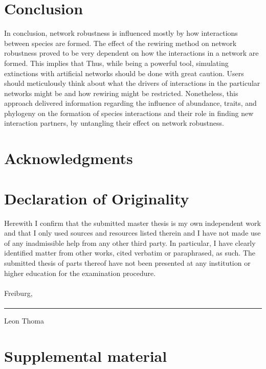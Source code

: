 \documentclass[12pt,a4paper]{article}
\begin{document}
\section{Conclusion}
In conclusion, network robustness is influenced mostly by how interactions between species are formed. The effect of the rewiring method on network robustness proved to be very dependent on how the interactions in a network are formed. This implies that
Thus, while being a powerful tool, simulating extinctions with artificial networks should be done with great caution. Users should meticulously think about what the drivers of interactions in the particular networks might be and how rewiring might be restricted. Nonetheless, this approach delivered information regarding the influence of abundance, traits, and phylogeny on the formation of species interactions and their role in finding new interaction partners, by untangling their effect on network robustness.
\section{Acknowledgments}
\newpage
\section*{Declaration of Originality}
Herewith I confirm that the submitted master thesis is my own independent work and that I only used sources and resources listed therein and I have not made use of any inadmissible help from any other third party. In particular, I have clearly identified matter from other works, cited verbatim or paraphrased, as such.
The submitted thesis of parts thereof have not been presented at any institution or higher education for the examination procedure.\paragraph{}

Freiburg,\paragraph{}

\rule{5cm}{.4pt}\par
Leon Thoma
\newpage
\section{Supplemental material}
\end{document}
